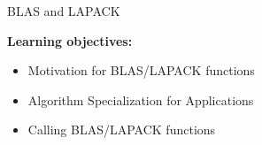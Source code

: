 \begin{frame}[fragile]

  {\Huge BLAS and LAPACK}

  \vspace{20pt}

  \textbf{Learning objectives:}
  \begin{itemize}
    \item {Motivation for BLAS/LAPACK functions}
    \item {Algorithm Specialization for Applications}
    \item {Calling BLAS/LAPACK functions}
  \end{itemize}

  \vspace{-20pt}
\end{frame}


